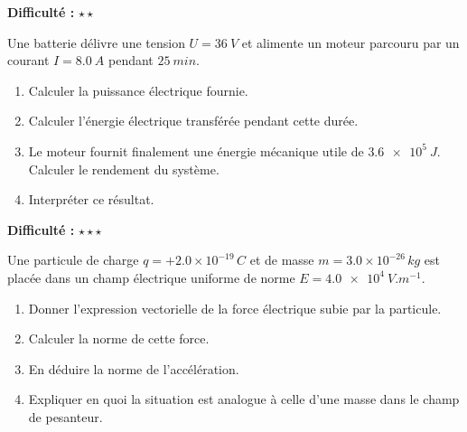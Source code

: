 \documentclass[11pt,a4paper]{article}
\newcommand{\etoiles}[1]{\textbf{Difficulté :} #1}
\begin{document}
\begin{exercisebox}
\etoiles{\(\star\star\)}

Une batterie délivre une tension \(U=\SI{36}{V}\) et alimente un moteur parcouru par un courant \(I=\SI{8.0}{A}\) pendant \(\SI{25}{min}\).

\begin{enumerate}[label=\alph*)]
    \item Calculer la puissance électrique fournie.
    \item Calculer l'énergie électrique transférée pendant cette durée.
    \item Le moteur fournit finalement une énergie mécanique utile de \(\SI{3.6e5}{J}\). Calculer le rendement du système.
    \item Interpréter ce résultat.
\end{enumerate}
\end{exercisebox}

\begin{exercisebox}
\etoiles{\(\star\star\star\)}

Une particule de charge \(q=+2.0\times 10^{-19}\,\si{C}\) et de masse \(m=3.0\times 10^{-26}\,\si{kg}\) est placée dans un champ électrique uniforme de norme \(E=\SI{4.0e4}{V.m^{-1}}\).

\begin{enumerate}[label=\alph*)]
    \item Donner l'expression vectorielle de la force électrique subie par la particule.
    \item Calculer la norme de cette force.
    \item En déduire la norme de l'accélération.
    \item Expliquer en quoi la situation est analogue à celle d'une masse dans le champ de pesanteur.
\end{enumerate}
\end{exercisebox}
\end{document}
